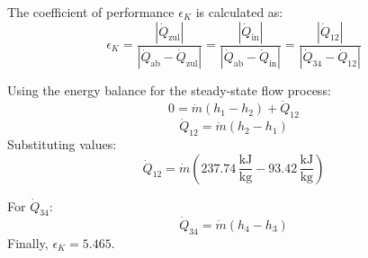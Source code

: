 The coefficient of performance \( \epsilon_K \) is calculated as:  
\[
\epsilon_K = \frac{|\dot{Q}_{\text{zul}}|}{|\dot{Q}_{\text{ab}} - \dot{Q}_{\text{zul}}|} = \frac{|\dot{Q}_{\text{in}}|}{|\dot{Q}_{\text{ab}} - \dot{Q}_{\text{in}}|} = \frac{|\dot{Q}_{12}|}{|\dot{Q}_{34} - \dot{Q}_{12}|}
\]

Using the energy balance for the steady-state flow process:  
\[
0 = \dot{m}(h_1 - h_2) + \dot{Q}_{12}
\]
\[
\dot{Q}_{12} = \dot{m}(h_2 - h_1)
\]
Substituting values:  
\[
\dot{Q}_{12} = \dot{m}(237.74 \, \frac{\text{kJ}}{\text{kg}} - 93.42 \, \frac{\text{kJ}}{\text{kg}})
\]

For \( \dot{Q}_{34} \):  
\[
\dot{Q}_{34} = \dot{m}(h_4 - h_3)
\]
Finally, \( \epsilon_K = 5.465 \).
